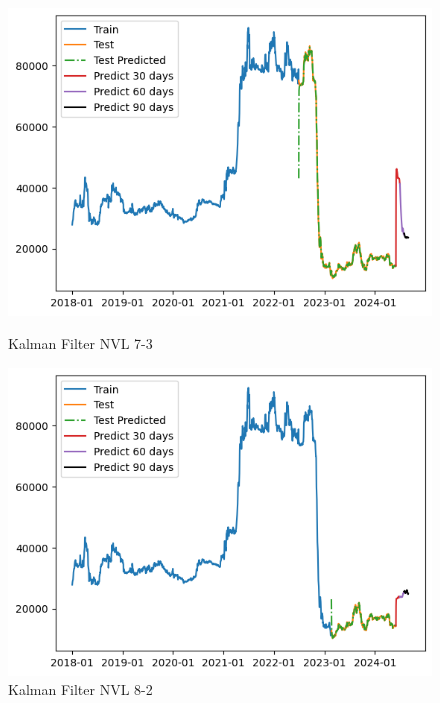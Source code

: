 \documentclass[conference]{IEEEtran}
\begin{document}
\begin{figure}[htbp]
    \begin{minipage}{0.23\textwidth}
    \centering
    \includegraphics[width=1\textwidth]{experiment/kf/NVL 7-3.png}
    \caption{Kalman Filter NVL 7-3}
    \label{fig:nvl_boxplot}
    \end{minipage}
    \hfill
    \begin{minipage}{0.23\textwidth}
    \centering
    \includegraphics[width=1\textwidth]{experiment/kf/NVL 8-2.png}
    \caption{Kalman Filter NVL 8-2}
    \label{fig:nvl_histogram}
    \end{minipage}
    \begin{minipage}{0.23\textwidth}
    \centering

\end{minipage}
\end{figure}
\end{document}
